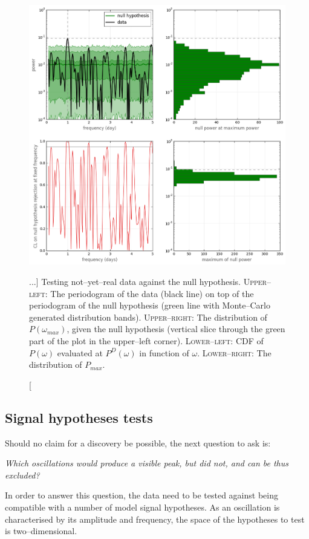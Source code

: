 \begin{figure}[bth]
  \myfloatalign
  \includegraphics[width=.8\linewidth]{gfx/axions/axionMC_null_rejection}
  \caption
  [...]
  {
Testing not--yet--real data against the null hypothesis. \textsc{Upper--left:} The periodogram of the data (black line) on top of the periodogram of the null hypothesis (green line with Monte--Carlo generated distribution bands). \textsc{Upper--right:} The distribution of $P(\omega_{max})$, given the null hypothesis (vertical slice through the green part of the plot in the upper--left corner). \textsc{Lower--left:} CDF of $P(\omega)$ evaluated at $P^D(\omega)$ in function of $\omega$. \textsc{Lower--right:} The distribution of $P_{max}$. }
  \label{fig:axions_null_rejection}
\end{figure}


\subsection{Signal hypotheses tests}
Should no claim for a discovery be possible, the next question to ask is:
\begin{center}
  \emph{Which oscillations would produce a visible peak, but did not, and can be thus excluded?}
\end{center}
In order to answer this question, the data need to be tested against being compatible with a number of model signal hypotheses. As an oscillation is characterised by its amplitude and frequency, the space of the hypotheses to test is two--dimensional.

